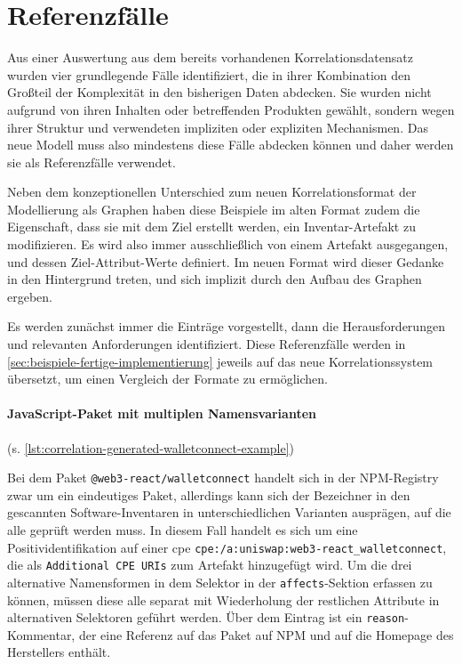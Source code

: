 \section{Referenzfälle}\label{sec:reference-case-chapter}

Aus einer Auswertung aus dem bereits vorhandenen Korrelationsdatensatz wurden vier grundlegende Fälle identifiziert, die in ihrer Kombination den Großteil der Komplexität in den bisherigen Daten abdecken.
Sie wurden nicht aufgrund von ihren Inhalten oder betreffenden Produkten gewählt, sondern wegen ihrer Struktur und verwendeten impliziten oder expliziten Mechanismen.
Das neue Modell muss also mindestens diese Fälle abdecken können und daher werden sie als Referenzfälle verwendet.

Neben dem konzeptionellen Unterschied zum neuen Korrelationsformat der Modellierung als Graphen haben diese Beispiele im alten Format zudem die Eigenschaft, dass sie mit dem Ziel erstellt werden, ein Inventar-Artefakt zu modifizieren.
Es wird also immer ausschließlich von einem Artefakt ausgegangen, und dessen Ziel-Attribut-Werte definiert.
Im neuen Format wird dieser Gedanke in den Hintergrund treten, und sich implizit durch den Aufbau des Graphen ergeben.

Es werden zunächst immer die Einträge vorgestellt, dann die Herausforderungen und relevanten Anforderungen identifiziert.
Diese Referenzfälle werden in \autoref{sec:beispiele-fertige-implementierung} jeweils auf das neue Korrelationssystem übersetzt, um einen Vergleich der Formate zu ermöglichen.

\paragraph{JavaScript-Paket mit multiplen Namensvarianten}\label{par:reference-case-walletconnect} (s. \autoref{lst:correlation-generated-walletconnect-example})

Bei dem Paket \texttt{@web3-react/walletconnect} handelt sich in der NPM-Registry zwar um ein eindeutiges Paket, allerdings kann sich der Bezeichner in den gescannten Software-Inventaren in unterschiedlichen Varianten ausprägen, auf die alle geprüft werden muss.
In diesem Fall handelt es sich um eine Positividentifikation auf einer \acrshort{cpe} \texttt{cpe:/a:uniswap:web3-react\_walletconnect}, die als \texttt{Additional CPE URIs} zum Artefakt hinzugefügt wird.
Um die drei alternative Namensformen in dem Selektor in der \texttt{affects}-Sektion erfassen zu können, müssen diese alle separat mit Wiederholung der restlichen Attribute in alternativen Selektoren geführt werden.
Über dem Eintrag ist ein \texttt{reason}-Kommentar, der eine Referenz auf das Paket auf NPM und auf die Homepage des Herstellers enthält.

